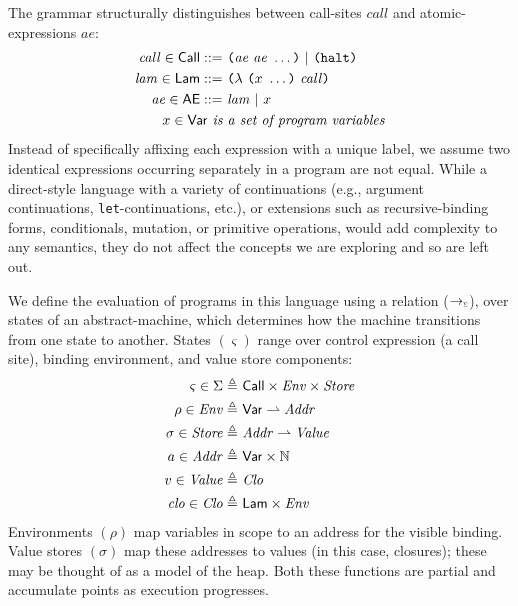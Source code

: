 The grammar structurally distinguishes between call-sites $call$ and atomic-expressions $ae$:
%
\begin{align*}
	\mathit{call} \in \mathsf{Call} ::=&\ \texttt{(} \mathit{ae}\ \mathit{ae}\ \ldots \texttt{)}\ \vert\ \texttt{(} \mathtt{halt} \texttt{)}  
  \\
	\mathit{lam} \in \mathsf{Lam} ::=&\ \texttt{(} \lambda\ \texttt{(} x\ \ldots \texttt{)}\ \mathit{call} \texttt{)} 
  \\
	\mathit{ae} \in \mathsf{AE} ::=&\ \mathit{lam}\ \vert\ x  
  \\
	x \in \mathsf{Var} \textit{\ is}&\textit{\ a set of program variables}
\end{align*}
%
Instead of specifically affixing each expression with a unique label, we assume two identical expressions occurring separately in a program are not equal.
%
While a direct-style language with a variety of continuations (e.g., argument continuations, \texttt{let}-continuations, etc.), 
or extensions such as recursive-binding forms, conditionals, mutation, or primitive operations, 
would add complexity to any semantics, they do not affect the concepts we are exploring and so are left out.


We define the evaluation of programs in this language using a relation ($\cTo$), over states of an abstract-machine, which determines how the 
machine transitions from one state to another.
%
States $(\varsigma)$ range over control expression (a call site), binding environment, and value store components:
%
\begin{align*}
  \varsigma \in \Sigma \triangleq&\ \mathsf{Call} \times \mathit{Env} \times \mathit{Store} 
  \\
  \rho \in \mathit{Env} \triangleq&\ \mathsf{Var} \rightharpoonup \mathit{Addr}  
  \\
  \sigma \in \mathit{Store} \triangleq&\ \mathit{Addr} \rightharpoonup \mathit{Value}  
  \\
  a \in \mathit{Addr} \triangleq&\ \mathsf{Var} \times \mathbb{N} 
  \\
  v \in \mathit{Value} \triangleq&\ \mathit{Clo}
  \\
  \mathit{clo} \in \mathit{Clo} \triangleq&\ \mathsf{Lam} \times \mathit{Env} 
\end{align*}
%
Environments $(\rho)$ map variables in scope to an address for the visible binding.
%
Value stores $(\sigma)$ map these addresses to values (in this case, closures); these may be thought of as a model of the heap.
%
Both these functions are partial and accumulate points as execution progresses.


